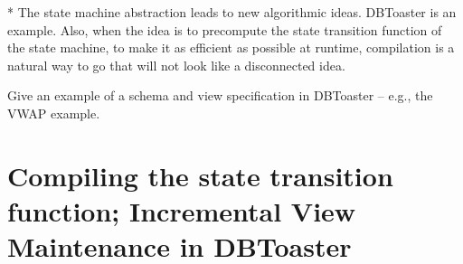 \documentclass{sig-alternate}
\begin{document}
* The state machine abstraction leads to new algorithmic ideas. DBToaster is an example. Also, when the idea is to precompute the state transition function of the state machine, to make it as efficient as possible at runtime, compilation is a natural way to go that will not look like a disconnected idea.




Give an example of a schema and view specification in DBToaster -- e.g., the VWAP example.






\section{Compiling the state transition function; Incremental View Maintenance in DBToaster}
\end{document}
